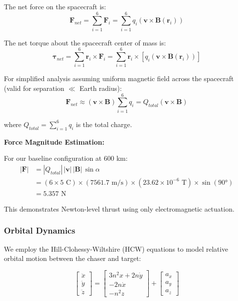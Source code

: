 \documentclass[12pt,a4paper]{article}
\begin{document}
The net force on the spacecraft is:
\begin{equation}
\mathbf{F}_{net} = \sum_{i=1}^{6} \mathbf{F}_i = \sum_{i=1}^{6} q_i (\mathbf{v} \times \mathbf{B}(\mathbf{r}_i))
\label{eq:net_force}
\end{equation}

The net torque about the spacecraft center of mass is:
\begin{equation}
\boldsymbol{\tau}_{net} = \sum_{i=1}^{6} \mathbf{r}_i \times \mathbf{F}_i = \sum_{i=1}^{6} \mathbf{r}_i \times [q_i (\mathbf{v} \times \mathbf{B}(\mathbf{r}_i))]
\label{eq:net_torque}
\end{equation}

For simplified analysis assuming uniform magnetic field across the spacecraft (valid for separation $\ll$ Earth radius):
\begin{equation}
\mathbf{F}_{net} \approx (\mathbf{v} \times \mathbf{B}) \sum_{i=1}^{6} q_i = Q_{total} (\mathbf{v} \times \mathbf{B})
\label{eq:simplified_force}
\end{equation}

where $Q_{total} = \sum_{i=1}^{6} q_i$ is the total charge.

\textbf{Force Magnitude Estimation:}

For our baseline configuration at 600 km:
\begin{align}
|\mathbf{F}| &= |Q_{total}| \, |\mathbf{v}| \, |\mathbf{B}| \, \sin\alpha \\
&= (6 \times 5\text{ C}) \times (7561.7\text{ m/s}) \times (23.62 \times 10^{-6}\text{ T}) \times \sin(90°) \\
&= 5.357\text{ N}
\label{eq:force_magnitude}
\end{align}

This demonstrates Newton-level thrust using only electromagnetic actuation.

\subsubsection{Orbital Dynamics}

We employ the Hill-Clohessy-Wiltshire (HCW) equations to model relative orbital motion between the chaser and target:

\begin{equation}
\begin{bmatrix}
\ddot{x} \\
\ddot{y} \\
\ddot{z}
\end{bmatrix}
=
\begin{bmatrix}
3n^2 x + 2n\dot{y} \\
-2n\dot{x} \\
-n^2 z
\end{bmatrix}
+
\begin{bmatrix}
a_x \\
a_y \\
a_z
\end{bmatrix}
\label{eq:hcw}
\end{equation}
\end{document}
